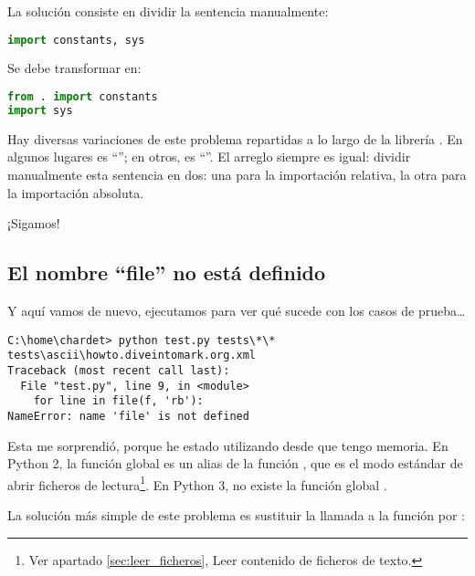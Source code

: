 La solución consiste en dividir la sentencia manualmente:

\begin{lstlisting}[language=Python,breaklines=true]
import constants, sys
\end{lstlisting}

Se debe transformar en:

\begin{lstlisting}[language=Python,breaklines=true]
from . import constants
import sys
\end{lstlisting}

Hay diversas variaciones de este problema repartidas a lo largo de la librería . En algunos lugares es ``''; en otros, es ``''. El arreglo siempre es igual: dividir manualmente esta sentencia en dos: una para la importación relativa, la otra para la importación absoluta.

¡Sigamos!

\subsection{El nombre ``file'' no está definido}

Y aquí vamos de nuevo, ejecutamos  para ver qué sucede con los casos de prueba\ldots

\noindent\begin{minipage}{\textwidth}
\begin{lstlisting}[breaklines=true]
C:\home\chardet> python test.py tests\*\*
tests\ascii\howto.diveintomark.org.xml
Traceback (most recent call last):
  File "test.py", line 9, in <module>
    for line in file(f, 'rb'):
NameError: name 'file' is not defined
\end{lstlisting}
\end{minipage}


Esta me sorprendió, porque he estado utilizando  desde que tengo memoria. En Python 2, la función global  es un alias de la función , que es el modo estándar de abrir ficheros de lectura\footnote{Ver apartado \ref{sec:leer_ficheros}, Leer contenido de ficheros de texto.}. En Python 3, no existe la función global .

La solución más simple de este problema es sustituir la llamada a la función  por :


